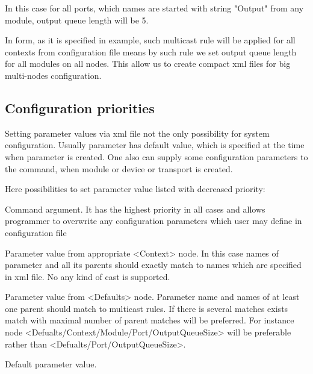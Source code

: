 In this case for all ports, which names are started with string "Output" from any module,
output queue length will be 5. 

In form, as it is specified in example, such multicast rule will be applied for 
all contexts from configuration file means by such rule we set output queue length 
for all modules on all nodes. This allow us to create compact xml files for big multi-nodes configuration.   


\subsection{Configuration priorities}

Setting parameter values via xml file not the only possibility for system configuration. 
Usually parameter has default value, which is specified at the time when parameter is created.
One also can supply some configuration parameters to the command, when module or device or transport is created.

Here possibilities to set parameter value listed with decreased priority:

\bbul
\item Command argument. It has the highest priority in all cases and allows programmer to
overwrite any configuration parameters which user may define in configuration file
\item Parameter value from appropriate <Context> node. In this case names of parameter and all its parents  
should exactly match to names which are specified in xml file. No any kind of cast is supported.  
\item Parameter value from <Defaults> node. Parameter name and names of at least one parent should match to multicast rules.
If there is several matches exists match with maximal number of parent matches will be preferred.
For instance node <Defualts/Context/Module/Port/OutputQueueSize> will be preferable rather than
<Defualts/Port/OutputQueueSize>. 
\item Default parameter value.
\ebul
    

